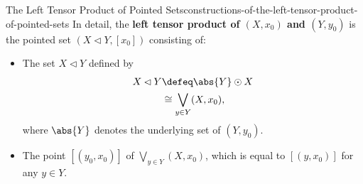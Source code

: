 \begin{construction}{The Left Tensor Product of Pointed Sets}{constructions-of-the-left-tensor-product-of-pointed-sets}%
    In detail, the \textbf{left tensor product of $(X,x_{0})$ and $(Y,y_{0})$} is the pointed set $(X\lhd Y,[x_{0}])$ consisting of:%
    \begin{itemize}
        \item{}The set $X\lhd Y$ defined by
            \begin{align*}
                X\lhd Y &\defeq \abs{Y}\odot X\\
                        &\cong  \bigvee_{y\in Y}(X,x_{0}),
            \end{align*}
            where $\abs{Y}$ denotes the underlying set of $(Y,y_{0})$.
        \item{}The point $[(y_{0},x_{0})]$ of $\bigvee_{y\in Y}(X,x_{0})$, which is equal to $[(y,x_{0})]$ for any $y\in Y$.
    \end{itemize}
\end{construction}
